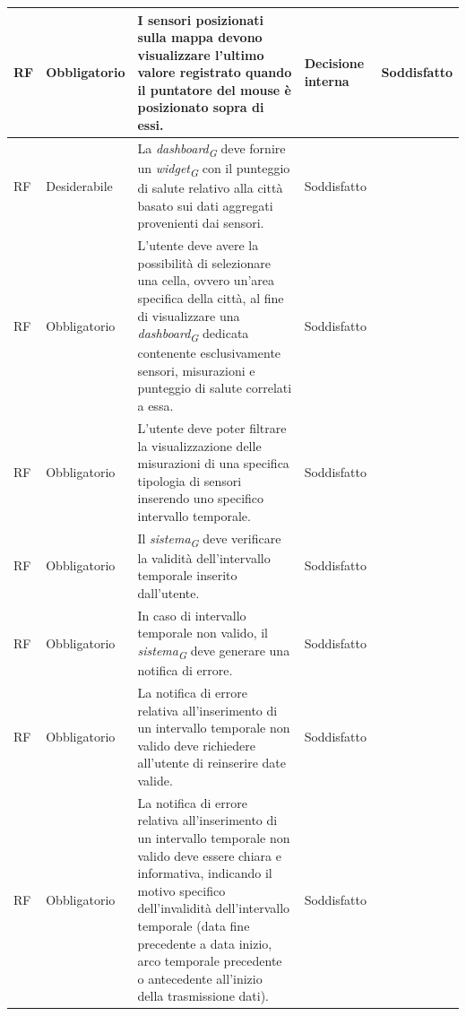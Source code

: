 \begin{longtable}{|C{1.5cm}|C{2cm}|L{5cm}|C{2cm}|C{1.5cm}|}
    \hline
     RF & Obbligatorio &  I sensori posizionati sulla mappa devono visualizzare l'ultimo valore registrato quando il puntatore del mouse è posizionato sopra di essi.& Decisione interna & Soddisfatto \\
    
    \hline
     RF & Desiderabile & La \textit{dashboard}\textsubscript{\textit{G}} deve fornire un \textit{widget}\textsubscript{\textit{G}} con il punteggio di salute relativo alla città basato sui dati aggregati provenienti dai sensori.& Soddisfatto \\
    
    \hline
     RF & Obbligatorio & L'utente deve avere la possibilità di selezionare una cella, ovvero un'area specifica della città, al fine di visualizzare una \textit{dashboard}\textsubscript{\textit{G}} dedicata contenente esclusivamente sensori, misurazioni e punteggio di salute correlati a essa.& Soddisfatto \\
    
    \hline
     RF & Obbligatorio & L'utente deve poter filtrare la visualizzazione delle misurazioni di una specifica tipologia di sensori inserendo uno specifico intervallo temporale.& Soddisfatto \\
    
    \hline
     RF & Obbligatorio & Il \textit{sistema}\textsubscript{\textit{G}} deve verificare la validità dell'intervallo temporale inserito dall'utente.& Soddisfatto \\
    
    \hline
     RF & Obbligatorio & In caso di intervallo temporale non valido, il \textit{sistema}\textsubscript{\textit{G}} deve generare una notifica di errore.& Soddisfatto \\
    
    \hline
     RF & Obbligatorio & La notifica di errore relativa all'inserimento di un intervallo temporale non valido deve richiedere all'utente di reinserire date valide.& Soddisfatto \\
    
    \hline
     RF & Obbligatorio & La notifica di errore relativa all'inserimento di un intervallo temporale non valido deve essere chiara e informativa, indicando il motivo specifico dell'invalidità dell'intervallo temporale (data fine precedente a data inizio, arco temporale precedente o antecedente all'inizio della trasmissione dati).& Soddisfatto \\
    

\end{longtable}
